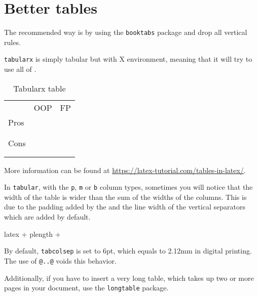 \section{Better tables}
The recommended way is by using the \texttt{booktabs} package and drop all vertical rules.

\texttt{tabularx} is simply tabular but with X environment, meaning that it will try to use all of \texttt{\linewidth}.

\begin{table}[H]
  \centering
  \caption{Tabularx table}%
  \label{tab:tabularx}
  \begin{tabularx}{\linewidth}{l*{2}{X}}
    \toprule
         & OOP & FP \\
    \cmidrule(lr){2-3}
    Pros &     &    \\
         &     &    \\
         &     &    \\
    \midrule
    Cons &     &    \\
         &     &    \\
         &     &    \\
    \bottomrule
  \end{tabularx}
\end{table}

More information can be found at \url{https://latex-tutorial.com/tables-in-latex/}.

In \texttt{tabular}, with the \texttt{p}, \texttt{m} or \texttt{b} column types, sometimes you will notice that the width of the table is wider than the sum of the widths of the columns.
This is due to the padding added by the \texttt{\tabcolsep} and the line width of the vertical separators which are added by default.

\begin{code}{latex}
  \tabcolsep + p{length} + \tabcolsep
\end{code}

By default, \texttt{tabcolsep} is set to 6pt, which equals to 2.12mm in digital printing.
The use of \texttt{@{}..@{}} voids this behavior.

Additionally, if you have to insert a very long table, which takes up two or more pages in your document, use the \texttt{longtable} package.

